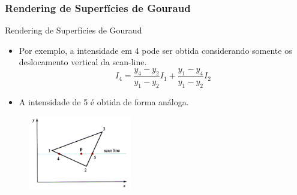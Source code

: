 \documentclass{beamer}
\begin{document}
\begin{frame}
\frametitle{Rendering de Superfícies de Gouraud}

		\begin{block}{Rendering de Superfícies de Gouraud}
		\begin{itemize}
			\item Por exemplo, a intensidade em 4 pode ser obtida considerando somente os deslocamento vertical da scan-line.
			\begin{equation*}
				I_4 = \frac{y_4-y_2}{y_1-y_2} I_1 + \frac{y_1-y_4}{y_1-y_2}I_2
			\end{equation*}
			\item A intensidade de 5 é obtida de forma análoga.
			\end{itemize}
	\end{block}
	
	\begin{figure}[!h]
			\begin{center}
			\includegraphics[width=0.4\textwidth]{Figures/Int1}
			\end{center}
		\end{figure}
	
\end{frame}
\end{document}
